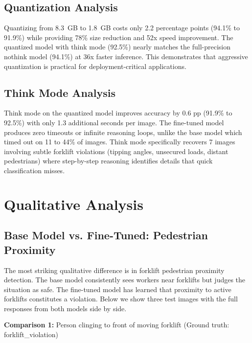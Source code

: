 \documentclass[12pt, a4paper]{article}
\begin{document}
\subsection{Quantization Analysis}

Quantizing from 8.3~GB to 1.8~GB costs only 2.2 percentage points (94.1\% to 91.9\%) while providing 78\% size reduction and 52x speed improvement. The quantized model with think mode (92.5\%) nearly matches the full-precision nothink model (94.1\%) at 36x faster inference. This demonstrates that aggressive quantization is practical for deployment-critical applications.

\subsection{Think Mode Analysis}

Think mode on the quantized model improves accuracy by 0.6 pp (91.9\% to 92.5\%) with only 1.3 additional seconds per image. The fine-tuned model produces zero timeouts or infinite reasoning loops, unlike the base model which timed out on 11 to 44\% of images. Think mode specifically recovers 7 images involving subtle forklift violations (tipping angles, unsecured loads, distant pedestrians) where step-by-step reasoning identifies details that quick classification misses.

\section{Qualitative Analysis}

\subsection{Base Model vs. Fine-Tuned: Pedestrian Proximity}

The most striking qualitative difference is in forklift pedestrian proximity detection. The base model consistently sees workers near forklifts but judges the situation as safe. The fine-tuned model has learned that proximity to active forklifts constitutes a violation. Below we show three test images with the full responses from both models side by side.

\vspace{1em}
\noindent\textbf{Comparison 1:} Person clinging to front of moving forklift (Ground truth: forklift\_violation)
\end{document}
